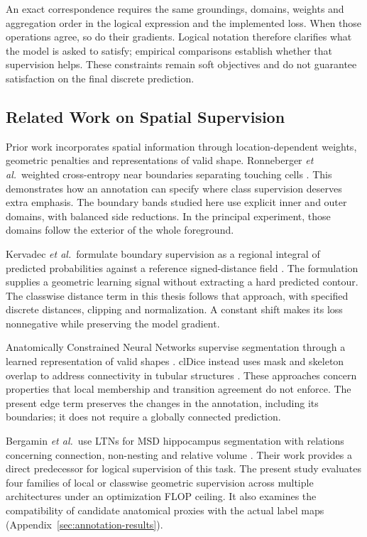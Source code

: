 \documentclass[12pt,a4paper]{article}
\begin{document}
An exact correspondence requires the same groundings, domains, weights
and aggregation order in the logical expression and the implemented loss.
When those operations agree, so do their gradients. Logical notation
therefore clarifies what the model is asked to satisfy; empirical
comparisons establish whether that supervision helps. These constraints
remain soft objectives and do not guarantee satisfaction on the final
discrete prediction.

\subsection{Related Work on Spatial Supervision}\label{sec:spatial-related-work}

Prior work incorporates spatial information through location-dependent
weights, geometric penalties and representations of valid shape.
Ronneberger \emph{et al.}\ weighted cross-entropy near boundaries separating
touching cells \cite{ronneberger2015unet}. This demonstrates how an
annotation can specify where class supervision deserves extra emphasis.
The boundary bands studied here use explicit inner and outer domains,
with balanced side reductions. In the principal experiment, those domains
follow the exterior of the whole foreground.

Kervadec \emph{et al.}\ formulate boundary supervision as a regional integral
of predicted probabilities against a reference signed-distance field
\cite{kervadec2019boundary}. The formulation supplies a geometric
learning signal without extracting a hard predicted contour. The
classwise distance term in this thesis follows that approach, with
specified discrete distances, clipping and normalization. A constant
shift makes its loss nonnegative while preserving the model gradient.

Anatomically Constrained Neural Networks supervise segmentation through
a learned representation of valid shapes \cite{oktay2017anatomically}.
clDice instead uses mask and skeleton overlap to address connectivity
in tubular structures \cite{shit2021cldice}. These approaches concern
properties that local membership and transition agreement do not enforce.
The present edge term preserves the changes in the annotation, including
its boundaries; it does not require a globally connected prediction.

Bergamin \emph{et al.}\ use LTNs for MSD hippocampus segmentation with relations
concerning connection, non-nesting and relative volume
\cite{bergamin2025integrating}. Their work provides a direct predecessor
for logical supervision of this task. The present study evaluates four
families of local or classwise geometric supervision across multiple
architectures under an optimization FLOP ceiling. It also examines the
compatibility of candidate anatomical proxies with the actual label maps
(Appendix~\ref{sec:annotation-results}).
\end{document}
